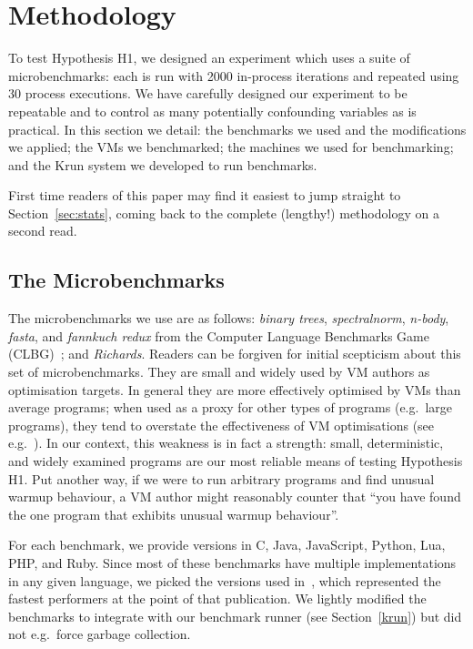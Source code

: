 \documentclass[acmsmall,screen]{acmart}
\newcommand{\krun}{Krun\xspace}
\newcommand{\hypone}{H1\xspace}
\newcommand{\binarytrees}{\emph{binary trees}\xspace}
\newcommand{\richards}{\emph{Richards}\xspace}
\newcommand{\spectralnorm}{\emph{spectralnorm}\xspace}
\newcommand{\nbody}{\emph{n-body}\xspace}
\newcommand{\fasta}{\emph{fasta}\xspace}
\newcommand{\fannkuch}{\emph{fannkuch redux}\xspace}
\newcommand{\numpexecs}{30\xspace}
\newcommand{\numiterations}{2000\xspace}
\begin{document}
\section{Methodology}
\label{sec:methodology}

To test Hypothesis \hypone, we designed an experiment which uses a suite of
microbenchmarks: each is run with \numiterations in-process iterations and repeated
using \numpexecs process executions. We have carefully designed our
experiment to be repeatable and to control as many potentially confounding variables as
is practical. In this section we detail: the benchmarks we used and the modifications we
applied; the VMs we benchmarked; the machines we used for benchmarking; and the
\krun system we developed to run benchmarks.

First time readers of this paper may find it easiest to jump straight to
Section~\ref{sec:stats}, coming back to the complete (lengthy!) methodology
on a second read.


\subsection{The Microbenchmarks}
\label{sec:microbenchmarks}

The microbenchmarks we use are as follows: \binarytrees, \spectralnorm, \nbody,
\fasta, and \fannkuch from the Computer Language Benchmarks Game (CLBG)~\cite{clbg}; and
\richards. Readers can be forgiven for initial scepticism about this set of microbenchmarks.
They are small and widely
used by VM authors as optimisation targets. In general they are more effectively
optimised by VMs than average programs; when used as a proxy for other types
of programs (e.g.~large programs), they tend to overstate the effectiveness of
VM optimisations (see e.g.~\cite{ratanaworabhan09jsmeter}). In our context, this weakness is in fact a strength:
small, deterministic, and widely examined programs are our most
reliable means of testing Hypothesis \hypone. Put another way, if we were to run arbitrary programs
and find unusual warmup behaviour, a VM author might reasonably counter that
``you have found the one program that exhibits unusual warmup behaviour''.

For each benchmark, we provide versions in C, Java, JavaScript, Python, Lua, PHP,
and Ruby. Since most of these
benchmarks have multiple implementations in any given language, we picked
the versions used in~\cite{bolz14impact}, which represented the fastest
performers at the point of that publication. We lightly modified
the benchmarks to integrate with our benchmark runner (see Section~\ref{krun})
but did not e.g.~force garbage collection.
\end{document}
